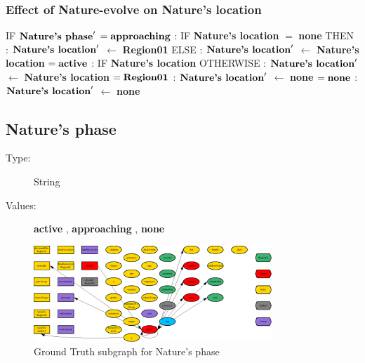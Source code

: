 \documentclass{article}%
\begin{document}
\subsubsection{Effect of Nature{-}evolve on Nature's location}%
\label{ssubsec:Effect of Nature{-}evolve on Nature's location}%
\begin{flushleft}%
IF %
$\mbox{\textbf{Nature's phase}} '$%
\linebreak%
\hspace*{2em}%
$= \mbox{\textbf{approaching}}$%
: %
IF %
\textbf{Nature's location}%
$=$%
\textbf{none}%
\linebreak%
\hspace*{4em}%
THEN %
: %
$\mbox{\textbf{Nature's location}} '$%
$\leftarrow$%
\textbf{Region01}%
\linebreak%
\hspace*{4em}%
ELSE %
: %
$\mbox{\textbf{Nature's location}} '$%
$\leftarrow$%
\textbf{Nature's location}%
\linebreak%
\hspace*{2em}%
$= \mbox{\textbf{active}}$%
: %
IF %
\textbf{Nature's location}%
\linebreak%
\hspace*{4em}%
OTHERWISE %
: %
$\mbox{\textbf{Nature's location}} '$%
$\leftarrow$%
\textbf{Nature's location}%
\linebreak%
\hspace*{4em}%
$= \mbox{\textbf{Region01}}$%
: %
$\mbox{\textbf{Nature's location}} '$%
$\leftarrow$%
\textbf{none}%
\linebreak%
\hspace*{2em}%
$= \mbox{\textbf{none}}$%
: %
$\mbox{\textbf{Nature's location}} '$%
$\leftarrow$%
\textbf{none}%
\end{flushleft}

%
\subsection{Nature's phase}%
\label{subsec:Nature's phase}%
\begin{description}%
\item[Type:]%
String%
\item[Values:]%
\textbf{active}%
, %
\textbf{approaching}%
, %
\textbf{none}%
\end{description}%


\begin{figure}[ht]%
\centering%
\includegraphics[width=0.8\textwidth]{images/phaseOfNature.png}%
\caption{Ground Truth subgraph for Nature's phase}%
\end{figure}
\end{document}
